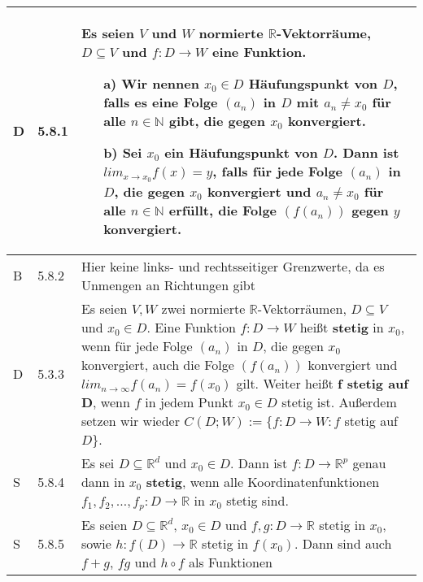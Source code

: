    \begin{longtable}{p{0.75cm} p{1cm} p{16cm}}
        \toprule

        D   & 5.8.1 &   Es seien $V$ und $W$ normierte $\mathbb{R}$-Vektorräume, $D \subseteq V$ und $f: D \rightarrow W$ eine Funktion.
                \begin{itemize}[topsep=-0.5cm]
                    \item[a)] Wir nennen $x_0 \in D$ \textbf{Häufungspunkt} von $D$, falls es eine Folge $(a_n)$ in $D$ mit 
                                $a_n \neq x_0$ für alle $n \in \mathbb{N}$ gibt, die gegen $x_0$ konvergiert.
                    \item[b)] Sei $x_0$ ein Häufungspunkt von $D$. Dann ist $lim_{x \rightarrow x_0} f(x) = y$, falls für jede 
                                Folge $(a_n)$ in $D$, die gegen $x_0$ konvergiert und $a_n \neq x_0$ für alle $n \in \mathbb{N}$
                                erfüllt, die Folge $(f(a_n))$ gegen $y$ konvergiert.
                \end{itemize} \vspace{-0cm} \\
        \midrule
        B   & 5.8.2 &   Hier keine links- und rechtsseitiger Grenzwerte, da es Unmengen an Richtungen gibt \\
        \midrule
        D   & 5.3.3 &   Es seien $V,W$ zwei normierte $\mathbb{R}$-Vektorräumen, $D \subseteq V$ und $x_0 \in D$. Eine Funktion $f: D\rightarrow W$
                        heißt \textbf{stetig} in $x_0$, wenn für jede Folge $(a_n)$ in $D$, die gegen $x_0$ konvergiert, auch die Folge
                        $(f(a_n))$ konvergiert und $lim_{n \rightarrow \infty} f(a_n) = f(x_0)$ gilt. \hfill \break
                        Weiter heißt \textbf{f stetig auf D}, wenn $f$ in jedem Punkt $x_0 \in D$ stetig ist. \hfill \break
                        Au\ss erdem setzen wir wieder $C(D;W) := \{f: D\rightarrow W: f$ stetig auf $D$\}. \\
        \midrule
        S   & 5.8.4 &   Es sei $D \subseteq \mathbb{R}^d$ und $x_0 \in D$. Dann ist $f: D \rightarrow \mathbb{R}^p$ genau dann in $x_0$
                        \textbf{stetig}, wenn alle Koordinatenfunktionen $f_1, f_2, \dots, f_p : D \rightarrow \mathbb{R}$ in $x_0$ stetig sind. \\
        \midrule
        S   & 5.8.5 &   Es seien $D \subseteq \mathbb{R}^d$, $x_0 \in D$ und $f,g : D \rightarrow \mathbb{R}$ stetig in $x_0$, sowie
                        $h : f(D) \rightarrow \mathbb{R}$ stetig in $f(x_0)$. Dann sind auch $f+g$, $fg$ und $h \circ f$ als Funktionen

\end{longtable}
